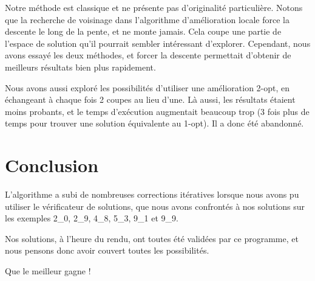 \documentclass[10pt,a4paper]{article}
\begin{document}
Notre méthode est classique et ne présente pas d'originalité particulière. Notons que la recherche de voisinage dans l'algorithme d'amélioration locale force la descente le long de la pente, et ne monte jamais. Cela coupe une partie de l'espace de solution qu'il pourrait sembler intéressant d'explorer. Cependant, nous avons essayé les deux méthodes, et forcer la descente permettait d'obtenir de meilleurs résultats bien plus rapidement.

Nous avons aussi exploré les possibilités d'utiliser une amélioration 2-opt, en échangeant à chaque fois 2 coupes au lieu d'une. Là aussi, les résultats étaient moins probants, et le temps d'exécution augmentait beaucoup trop (3 fois plus de temps pour trouver une solution équivalente au 1-opt). Il a donc été abandonné.

\section{Conclusion}

L'algorithme a subi de nombreuses corrections itératives lorsque nous avons pu utiliser le vérificateur de solutions, que nous avons confrontés à nos solutions sur les exemples 2\_0, 2\_9, 4\_8, 5\_3, 9\_1 et 9\_9.

Nos solutions, à l'heure du rendu, ont toutes été validées par ce programme, et nous pensons donc avoir couvert toutes les possibilités.

Que le meilleur gagne !
\end{document}
